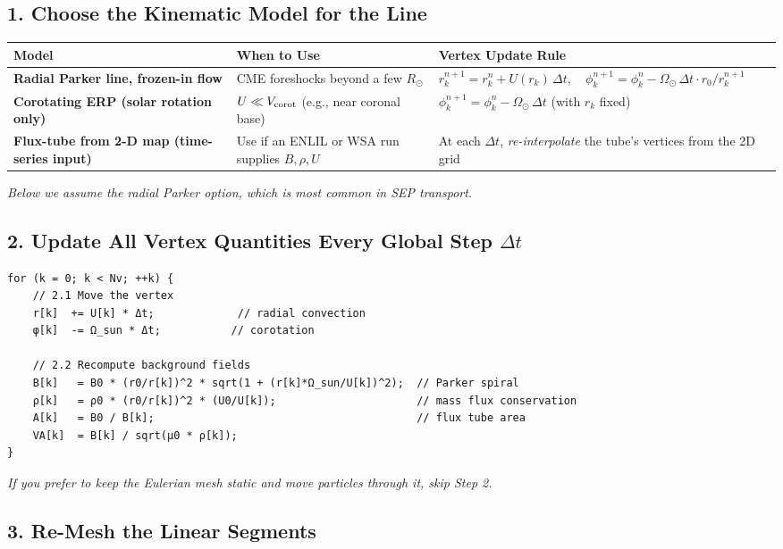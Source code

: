 \subsection*{1. Choose the Kinematic Model for the Line}

\begin{tabular}{|p{4.1cm}|p{5.4cm}|p{6.3cm}|}
\hline
\textbf{Model} & \textbf{When to Use} & \textbf{Vertex Update Rule} \\
\hline
\textbf{Radial Parker line, frozen-in flow} & CME foreshocks beyond a few $R_\odot$ & $r_k^{n+1} = r_k^n + U(r_k)\,\Delta t,\quad \phi_k^{n+1} = \phi_k^n - \Omega_\odot\,\Delta t \cdot r_0/r_k^{n+1}$ \\
\textbf{Corotating ERP (solar rotation only)} & $U \ll V_{\rm corot}$ (e.g., near coronal base) & $\phi_k^{n+1} = \phi_k^n - \Omega_\odot\,\Delta t$ (with $r_k$ fixed) \\
\textbf{Flux-tube from 2-D map (time-series input)} & Use if an ENLIL or WSA run supplies $B,\rho,U$ & At each $\Delta t$, \textit{re-interpolate} the tube’s vertices from the 2D grid \\
\hline
\end{tabular}

\medskip

\textit{Below we assume the radial Parker option, which is most common in SEP transport.}

\subsection*{2. Update All Vertex Quantities Every Global Step $\Delta t$}

\begin{lstlisting}
for (k = 0; k < Nv; ++k) {
    // 2.1 Move the vertex
    r[k]  += U[k] * Δt;             // radial convection
    φ[k]  -= Ω_sun * Δt;           // corotation

    // 2.2 Recompute background fields
    B[k]   = B0 * (r0/r[k])^2 * sqrt(1 + (r[k]*Ω_sun/U[k])^2);  // Parker spiral
    ρ[k]   = ρ0 * (r0/r[k])^2 * (U0/U[k]);                      // mass flux conservation
    A[k]   = B0 / B[k];                                         // flux tube area
    VA[k]  = B[k] / sqrt(μ0 * ρ[k]);
}
\end{lstlisting}

\textit{If you prefer to keep the Eulerian mesh static and move particles through it, skip Step 2.}

\subsection*{3. Re-Mesh the \textbf{Linear Segments}}


